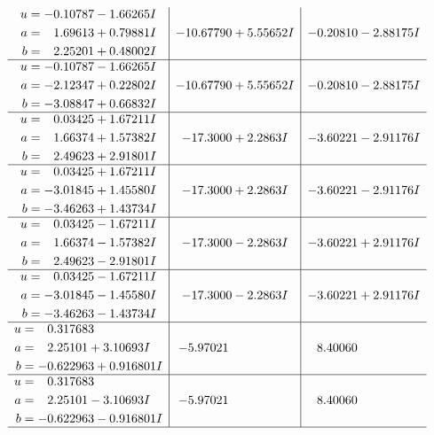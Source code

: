 \documentclass[1p]{elsarticle_modified}
\theoremstyle{definition}
\begin{document}
$$\begin{array}{c|c|c}
\begin{aligned}
u &= -0.10787 - 1.66265 I \\
a &= \phantom{-}1.69613 + 0.79881 I \\
b &= \phantom{-}2.25201 + 0.48002 I\end{aligned}
 & -10.67790 + 5.55652 I & -0.20810 - 2.88175 I \\ \hline\begin{aligned}
u &= -0.10787 - 1.66265 I \\
a &= -2.12347 + 0.22802 I \\
b &= -3.08847 + 0.66832 I\end{aligned}
 & -10.67790 + 5.55652 I & -0.20810 - 2.88175 I \\ \hline\begin{aligned}
u &= \phantom{-}0.03425 + 1.67211 I \\
a &= \phantom{-}1.66374 + 1.57382 I \\
b &= \phantom{-}2.49623 + 2.91801 I\end{aligned}
 & -17.3000 + 2.2863 I & -3.60221 - 2.91176 I \\ \hline\begin{aligned}
u &= \phantom{-}0.03425 + 1.67211 I \\
a &= -3.01845 + 1.45580 I \\
b &= -3.46263 + 1.43734 I\end{aligned}
 & -17.3000 + 2.2863 I & -3.60221 - 2.91176 I \\ \hline\begin{aligned}
u &= \phantom{-}0.03425 - 1.67211 I \\
a &= \phantom{-}1.66374 - 1.57382 I \\
b &= \phantom{-}2.49623 - 2.91801 I\end{aligned}
 & -17.3000 - 2.2863 I & -3.60221 + 2.91176 I \\ \hline\begin{aligned}
u &= \phantom{-}0.03425 - 1.67211 I \\
a &= -3.01845 - 1.45580 I \\
b &= -3.46263 - 1.43734 I\end{aligned}
 & -17.3000 - 2.2863 I & -3.60221 + 2.91176 I \\ \hline\begin{aligned}
u &= \phantom{-}0.317683\phantom{ +0.000000I} \\
a &= \phantom{-}2.25101 + 3.10693 I \\
b &= -0.622963 + 0.916801 I\end{aligned}
 & -5.97021\phantom{ +0.000000I} & \phantom{-}8.40060\phantom{ +0.000000I} \\ \hline\begin{aligned}
u &= \phantom{-}0.317683\phantom{ +0.000000I} \\
a &= \phantom{-}2.25101 - 3.10693 I \\
b &= -0.622963 - 0.916801 I\end{aligned}
 & -5.97021\phantom{ +0.000000I} & \phantom{-}8.40060\phantom{ +0.000000I}\\
 \hline 
 \end{array}$$\newpage\newpage\renewcommand{\arraystretch}{1}
\end{document}
